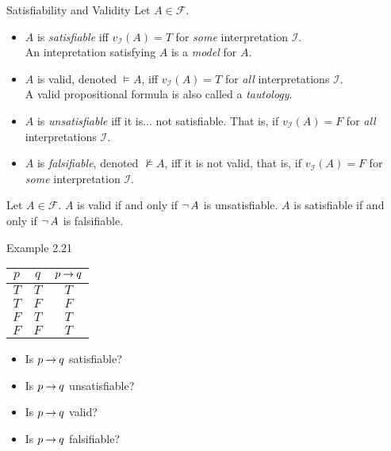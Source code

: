 \documentclass[style=sailor,size=12pt]{powerdot}
\theoremstyle{definition}
\newenvironment{defn}[1]
  {\renewcommand\theinnerdefn{#1}\innerdefn}
  {\endinnerdefn}
\newenvironment{thm}[1]
  {\renewcommand\theinnerthm{#1}\innerthm}
  {\endinnerthm}
\begin{document}
\begin{wideslide}[bm=,toc=]{Satisfiability and Validity}
\begin{defn}{2.38}[Ben Ari]
Let $A \in \mathcal{F}$.
\begin{itemize}
\item $A$ is \emph{satisfiable} iff $v_{\mathcal{I}}(A) = T$ for \emph{some}
      interpretation $\mathcal{I}$.\\
      An intepretation satisfying $A$ is a \emph{model} for $A$.

\item $A$ is valid, denoted $\models A$, iff $v_{\mathcal{I}}(A)=T$ for
      \emph{all} interpretations $\mathcal{I}$.\\
      A valid propositional formula is also called a \emph{tautology}.

\item $A$ is \emph{unsatisfiable} iff it is... not satisfiable. That is, if
      $v_{\mathcal{I}}(A) = F$ for \emph{all} interpretations $\mathcal{I}$.

\item $A$ is \emph{falsifiable}, denoted $\not\models A$, iff it is not valid,
      that is, if $v_{\mathcal{I}}(A) = F$ for \emph{some} interpretation
      $\mathcal{I}$.
\end{itemize}
\end{defn}
\begin{thm}{2.39}[Ben Ari]
Let $A \in \mathcal{F}$. $A$ is valid if and only if $\mathop{\neg} A$ is unsatisfiable.
$A$ is satisfiable if and only if $\mathop{\neg} A$ is falsifiable.
\end{thm}
\end{wideslide}


\begin{wideslide}[bm=,toc=]{Example 2.21}
\begin{center}
\begin{tabular}{|c|c||c|}
\hline
$p$ & $q$ & $p \mathbin{\rightarrow} q$ \\ \hline \hline
$T$ & $T$ & $T$  \\ \hline
$T$ & $F$ & $F$  \\ \hline
$F$ & $T$ & $T$  \\ \hline
$F$ & $F$ & $T$  \\ \hline
\end{tabular}
\end{center}
\begin{itemize}
\item Is $p \mathbin{\rightarrow} q$ satisfiable?
\item Is $p \mathbin{\rightarrow} q$ unsatisfiable?
\item Is $p \mathbin{\rightarrow} q$ valid?
\item Is $p \mathbin{\rightarrow} q$ falsifiable?
\end{itemize}
\end{wideslide}
\end{document}
